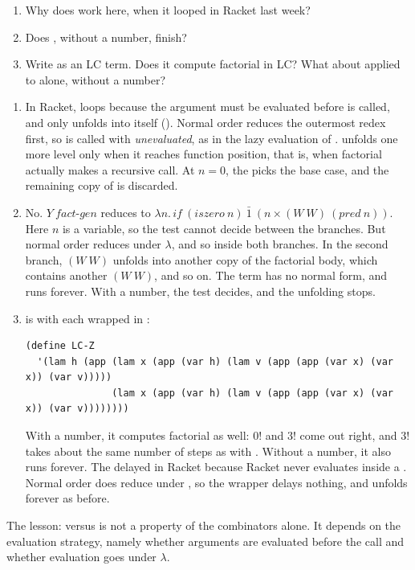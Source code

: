 \begin{exercise}[Discussion]
\leavevmode
\begin{enumerate}
  \item Why does  work here, when it looped in Racket last week?
  \item Does , without a number, finish?
  \item Write  as an LC term. Does it compute factorial in LC? What about  applied to  alone, without a number?
\end{enumerate}
\end{exercise}
\begin{solution}
\begin{enumerate}
  \item In Racket,  loops because the argument  must be evaluated before  is called, and  only unfolds into itself (). Normal order reduces the outermost redex first, so  is called with  \emph{unevaluated}, as in the lazy evaluation of .  unfolds one more level only when it reaches function position, that is, when factorial actually makes a recursive call. At $n = 0$, the  picks the base case, and the remaining copy of  is discarded.
  \item No. $Y\ \mathit{fact\mbox{-}gen}$ reduces to $\lambda n.\, \mathit{if}\ (\mathit{iszero}\ n)\ \bar 1\ (n \times (W\ W)\ (\mathit{pred}\ n))$. Here $n$ is a variable, so the test cannot decide between the branches. But normal order reduces under $\lambda$, and so inside both branches. In the second branch, $(W\ W)$ unfolds into another copy of the factorial body, which contains another $(W\ W)$, and so on. The term has no normal form, and  runs forever. With a number, the test decides, and the unfolding stops.
  \item {} is  with each  wrapped in :
\begin{lstlisting}
(define LC-Z
  '(lam h (app (lam x (app (var h) (lam v (app (app (var x) (var x)) (var v)))))
               (lam x (app (var h) (lam v (app (app (var x) (var x)) (var v))))))))
\end{lstlisting}
  With a number, it computes factorial as well: $0!$ and $3!$ come out right, and $3!$ takes about the same number of steps as with . Without a number, it also runs forever. The  delayed  in Racket because Racket never evaluates inside a . Normal order does reduce under , so the wrapper delays nothing, and  unfolds forever as before.
\end{enumerate}
The lesson:  versus  is not a property of the combinators alone. It depends on the evaluation strategy, namely whether arguments are evaluated before the call and whether evaluation goes under $\lambda$.
\end{solution}
